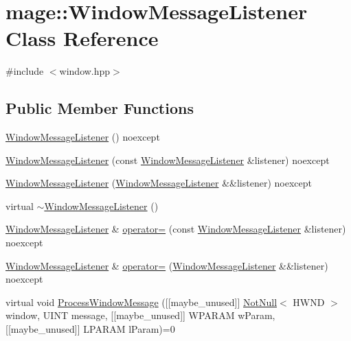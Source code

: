\hypertarget{classmage_1_1_window_message_listener}{}\section{mage\+:\+:Window\+Message\+Listener Class Reference}
\label{classmage_1_1_window_message_listener}


{\ttfamily \#include $<$window.\+hpp$>$}

\subsection*{Public Member Functions}
\begin{DoxyCompactItemize}
\item 
\hyperlink{classmage_1_1_window_message_listener_aff8433123e461b636275cbdded24ead2}{Window\+Message\+Listener} () noexcept
\item 
\hyperlink{classmage_1_1_window_message_listener_a41a34991bfeb38d37685b1f8a7d90d1e}{Window\+Message\+Listener} (const \hyperlink{classmage_1_1_window_message_listener}{Window\+Message\+Listener} \&listener) noexcept
\item 
\hyperlink{classmage_1_1_window_message_listener_a5d90d0e20cda37ee83a00696fb40f3c3}{Window\+Message\+Listener} (\hyperlink{classmage_1_1_window_message_listener}{Window\+Message\+Listener} \&\&listener) noexcept
\item 
virtual \hyperlink{classmage_1_1_window_message_listener_ae0972346e59184cb01d674dfa8269d32}{$\sim$\+Window\+Message\+Listener} ()
\item 
\hyperlink{classmage_1_1_window_message_listener}{Window\+Message\+Listener} \& \hyperlink{classmage_1_1_window_message_listener_a6c4b5ae43b7c1e14d16c3ba639746804}{operator=} (const \hyperlink{classmage_1_1_window_message_listener}{Window\+Message\+Listener} \&listener) noexcept
\item 
\hyperlink{classmage_1_1_window_message_listener}{Window\+Message\+Listener} \& \hyperlink{classmage_1_1_window_message_listener_a74dee5de5b949db3eb755936ee15ecb9}{operator=} (\hyperlink{classmage_1_1_window_message_listener}{Window\+Message\+Listener} \&\&listener) noexcept
\item 
virtual void \hyperlink{classmage_1_1_window_message_listener_a79f2782fa7bd3d1b50cf62cdd3f5c549}{Process\+Window\+Message} (\mbox{[}\mbox{[}maybe\+\_\+unused\mbox{]}\mbox{]} \hyperlink{namespacemage_a8769f9d670d6b585ea306cb1062af94b}{Not\+Null}$<$ H\+W\+ND $>$ window, U\+I\+NT message, \mbox{[}\mbox{[}maybe\+\_\+unused\mbox{]}\mbox{]} W\+P\+A\+R\+AM w\+Param, \mbox{[}\mbox{[}maybe\+\_\+unused\mbox{]}\mbox{]} L\+P\+A\+R\+AM l\+Param)=0
\end{DoxyCompactItemize}


